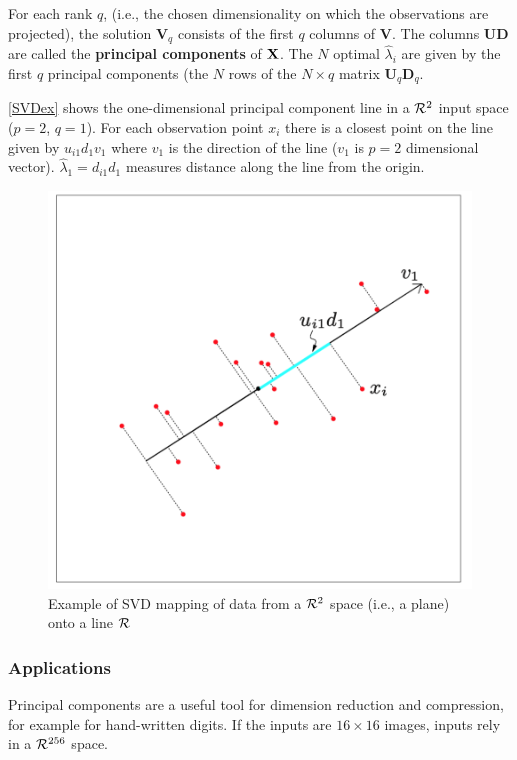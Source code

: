 For each rank $q$, (i.e., the chosen dimensionality on which the observations are projected), the solution $\mathbf{V}_q$  consists of the first $q$ columns of $\mathbf{V}$. The columns $\mathbf{UD}$ are called the \textbf{principal components} of $\mathrm{\mathbf{X}}$. The $N$ optimal $\hat{\lambda}_i$ are given by the first $q$ principal components (the $N$ rows of the $N \times q$ matrix $\mathbf{U}_q\mathbf{D}_q$.

\autoref{SVDex} shows the one-dimensional principal component line in a $\CMcal{R}^2$ input space ($p=2$, $q=1$). For each observation point $x_i$ there is a closest point on the line given by $u_{i1}d_1v_1$ where $v_1$ is the direction of the line ($v_1$ is $p=2$ dimensional vector). $\hat{\lambda}_1=d_{i1}d_1$ measures distance along the line from the origin.

\begin{figure}
\centering
\includegraphics[scale=0.5]{img/SVD}
\caption{Example of SVD mapping of data from a $\CMcal{R}^2$ space (i.e., a plane) onto a line $\CMcal{R}$}
\label{SVDex}
\end{figure}
\subsubsection{Applications}
Principal components are a useful tool for dimension reduction and compression, for example for hand-written digits. If the inputs are $16\times 16$ images, inputs rely in  a $\CMcal{R}^{256}$ space.

